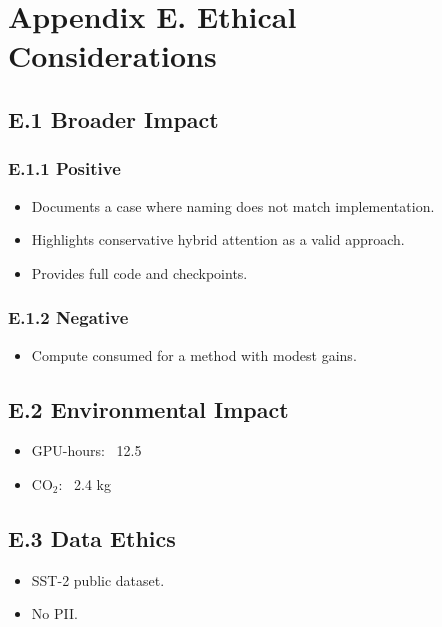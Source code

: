 
\section{Appendix E. Ethical Considerations}

\subsection{E.1 Broader Impact}

\subsubsection{E.1.1 Positive}

\begin{itemize}
\item Documents a case where naming does not match implementation.
\item Highlights conservative hybrid attention as a valid approach.
\item Provides full code and checkpoints.

\end{itemize}
\subsubsection{E.1.2 Negative}

\begin{itemize}
\item Compute consumed for a method with modest gains.

\end{itemize}
\subsection{E.2 Environmental Impact}

\begin{itemize}
\item GPU-hours: ~12.5
\item CO$_2$: ~2.4 kg

\end{itemize}
\subsection{E.3 Data Ethics}

\begin{itemize}
\item SST-2 public dataset.
\item No PII.

\end{itemize}
